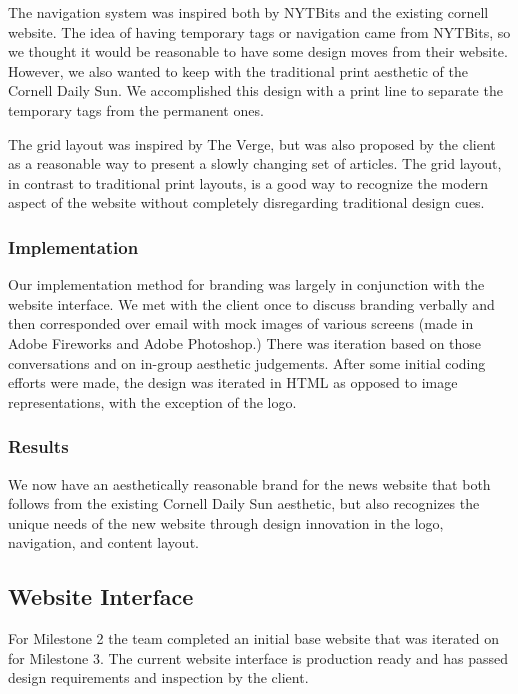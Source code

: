 \documentclass[12pt]{article} %
\begin{document}
The navigation system was inspired both by NYTBits and the existing cornell website. The idea of having temporary tags or navigation came from NYTBits, so we thought it would be reasonable to have some design moves from their website. However,  we also wanted to keep with the traditional print aesthetic of the Cornell Daily Sun. We accomplished this design with a print line to separate the temporary tags from the permanent ones.

The grid layout was inspired by The Verge, but was also proposed by the client as a reasonable way to present a slowly changing set of articles. The grid layout, in contrast to traditional print layouts, is a good way to recognize the modern aspect of the website without completely disregarding traditional design cues.

\subsubsection{Implementation}

Our implementation method for branding was largely in conjunction with the website interface. We met with the client once to discuss branding verbally and then corresponded over email with mock images of various screens (made in Adobe Fireworks and Adobe Photoshop.) There was iteration based on those conversations and on in-group aesthetic judgements. After some initial coding efforts were made, the design was iterated in HTML as opposed to image representations, with the exception of the logo.

\subsubsection{Results}

We now have an aesthetically reasonable brand for the news website that both follows from the existing Cornell Daily Sun aesthetic, but also recognizes the unique needs of the new website through design innovation in the logo, navigation, and content layout.

\subsection{Website Interface}

For Milestone 2 the team completed an initial base website that was iterated on for Milestone 3. The current website interface is production ready and has passed design requirements and inspection by the client.
\end{document}
